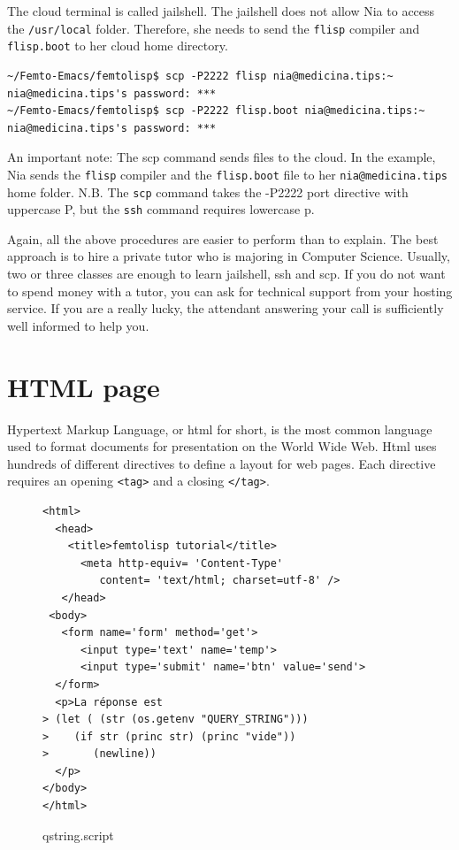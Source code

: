 \documentclass[a4paper,12pt]{book}
\begin{document}
The cloud terminal  is called
jailshell. The jailshell does not allow Nia
to access the \verb|/usr/local| folder.
Therefore, she needs to send the \verb|flisp| compiler and
\verb|flisp.boot| to her cloud home directory.
\begin{Verbatim}[fontsize=\small,
    frame=single,
    framerule=0.5mm]
~/Femto-Emacs/femtolisp$ scp -P2222 flisp nia@medicina.tips:~
nia@medicina.tips's password: ***
~/Femto-Emacs/femtolisp$ scp -P2222 flisp.boot nia@medicina.tips:~
nia@medicina.tips's password: ***
\end{Verbatim}
An important note: The scp command sends files to
the cloud. In the example, Nia sends the \verb|flisp|
compiler and the \verb|flisp.boot| file
to her  \verb|nia@medicina.tips| home folder.
N.B. The \verb|scp| command takes the -P2222
port directive with uppercase P,
but the \verb|ssh| command requires lowercase p.

Again, all the above procedures are easier to perform
than to explain. The best approach is to hire a private
tutor who is  majoring in Computer Science.
Usually, two or three classes are enough to
learn jailshell, ssh and scp.
If you do not want to spend money with
a tutor,  you can ask for
technical support from your hosting service. 
If you are a really lucky, the attendant
answering your call is sufficiently well
informed to help you.

\section{HTML page}
Hypertext Markup Language, or html for short, is the most
common language used to format documents
for presentation on the World Wide Web.
Html uses hundreds of different directives to define
a layout for web pages. Each directive requires an
opening \verb|<tag>| and a closing \verb|</tag>|.

\begin{figure}[!h]
\begin{verbatim}
<html>
  <head>
    <title>femtolisp tutorial</title>
      <meta http-equiv= 'Content-Type'
         content= 'text/html; charset=utf-8' />
   </head>
 <body>
   <form name='form' method='get'>
      <input type='text' name='temp'>
      <input type='submit' name='btn' value='send'>
  </form>
  <p>La réponse est  
> (let ( (str (os.getenv "QUERY_STRING")))
>    (if str (princ str) (princ "vide"))
>       (newline))
  </p>
</body>
</html>
\end{verbatim}
\caption{qstring.script}
\label{lst:qstring.script}
\end{figure}
\end{document}
